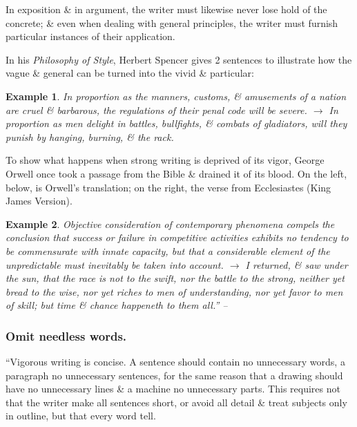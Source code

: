 \documentclass{article}
\newtheorem{example}{Example}
\begin{document}
In exposition \&  in argument, the writer must likewise never lose hold of the concrete; \&  even when dealing with general principles, the writer must furnish particular instances of their application.

In his {\it Philosophy of Style}, Herbert Spencer gives 2 sentences to illustrate how the vague \&  general can be turned into the vivid \&  particular:
\begin{example}
	In proportion as the manners, customs, \&  amusements of a nation are cruel \&  barbarous, the regulations of their penal code will be severe. $\to$ In proportion as men delight in battles, bullfights, \&  combats of gladiators, will they punish by hanging, burning, \&  the rack.
\end{example}
To show what happens when strong writing is deprived of its vigor, George Orwell once took a passage from the Bible \&  drained it of its blood. On the left, below, is Orwell’s translation; on the right, the verse from Ecclesiastes (King James Version).
\begin{example}
	Objective consideration of contemporary phenomena compels the conclusion that success or failure in competitive activities exhibits no tendency to be commensurate with innate capacity, but that a considerable element of the unpredictable must inevitably be taken into account. $\to$ I returned, \&  saw under the sun, that the race is not to the swift, nor the battle to the strong, neither yet bread to the wise, nor yet riches to men of understanding, nor yet favor to men of skill; but time \&  chance happeneth to them all.'' -- \cite[pp. 35--36]{Strunk_White_element_style}
\end{example}


\subsubsection{Omit needless words.}
``Vigorous writing is concise. A sentence should contain no unnecessary words, a paragraph no unnecessary sentences, for the same reason that a drawing should have no unnecessary lines \&  a machine no unnecessary parts. This requires not that the writer make all sentences short, or avoid all detail \&  treat subjects only in outline, but that every word tell.
\end{document}
